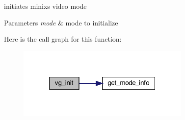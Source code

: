 initiates minix\textquotesingle{}s video mode 


\begin{DoxyParams}{Parameters}
{\em mode} & mode to initialize \\
\hline
\end{DoxyParams}
Here is the call graph for this function\+:\nopagebreak
\begin{figure}[H]
\begin{center}
\leavevmode
\includegraphics[width=241pt]{group__Video_gaa6c1ff5024cd4d15e476bce487584daa_cgraph}
\end{center}
\end{figure}
